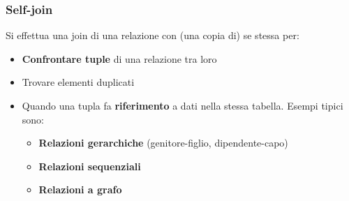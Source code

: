 \documentclass[12pt]{article}
\begin{document}
\subsubsection{Self-join}
Si effettua una join di una relazione con (una copia di) se stessa per:
\begin{itemize}
    \item \textbf{Confrontare tuple} di una relazione tra loro
    \item Trovare elementi duplicati
    \item Quando una tupla fa \textbf{riferimento} a dati nella stessa tabella. Esempi tipici sono:
    \begin{itemize}
        \item \textbf{Relazioni gerarchiche} (genitore-figlio, dipendente-capo)
        \item \textbf{Relazioni sequenziali}
        \item \textbf{Relazioni a grafo}
    \end{itemize}
\end{itemize}
\end{document}
